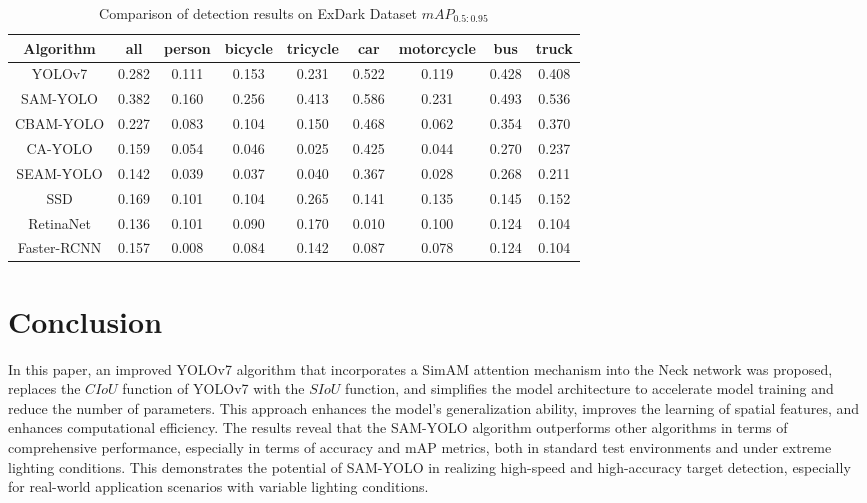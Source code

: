 \documentclass[aic]{iosart2x}
\begin{document}
\begin{table}[!htbp]
    \centering        
    \caption{Comparison of detection results on ExDark Dataset $mAP_{0.5:0.95}$}
    \label{tab:comparative_experiment_ap_95_ExDark}
    \begin{tabular}{ccccccccc}
        \toprule  
 Algorithm   & all   & person & bicycle & tricycle & car   & motorcycle & bus   & truck \\ \midrule
 YOLOv7      & 0.282 & 0.111  & 0.153   & 0.231    & 0.522 & 0.119      & 0.428 & 0.408 \\
 SAM-YOLO    & 0.382 & 0.160  & 0.256   & 0.413    & 0.586 & 0.231      & 0.493 & 0.536 \\
 CBAM-YOLO   & 0.227 & 0.083  & 0.104   & 0.150    & 0.468 & 0.062      & 0.354 & 0.370 \\
 CA-YOLO     & 0.159 & 0.054  & 0.046   & 0.025    & 0.425 & 0.044      & 0.270 & 0.237 \\
 SEAM-YOLO   & 0.142 & 0.039  & 0.037   & 0.040    & 0.367 & 0.028      & 0.268 & 0.211 \\
 SSD         & 0.169 & 0.101  & 0.104   & 0.265    & 0.141 & 0.135      & 0.145 & 0.152 \\
 RetinaNet   & 0.136 & 0.101  & 0.090   & 0.170    & 0.010 & 0.100      & 0.124 & 0.104 \\ 
 Faster-RCNN & 0.157 & 0.008  & 0.084   & 0.142    & 0.087 & 0.078      & 0.124 & 0.104 \\ 
        \bottomrule
    \end{tabular}
\end{table}\section{Conclusion} \label{sec:conclusion}

In this paper, an improved YOLOv7 algorithm that incorporates a SimAM attention mechanism into the Neck network was proposed, replaces the $CIoU$ function of YOLOv7 with the $SIoU$ function, and simplifies the model architecture to accelerate model training and reduce the number of parameters.  This approach enhances the model's generalization ability, improves the learning of spatial features, and enhances computational efficiency. The results reveal that the SAM-YOLO algorithm outperforms other algorithms in terms of comprehensive performance, especially in terms of accuracy and mAP metrics, both in standard test environments and under extreme lighting conditions. This demonstrates the potential of SAM-YOLO in realizing high-speed and high-accuracy target detection, especially for real-world application scenarios with variable lighting conditions.
\end{document}
